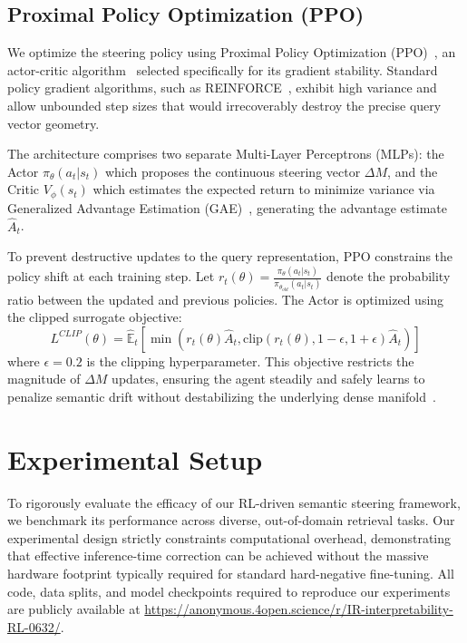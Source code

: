 \subsection{Proximal Policy Optimization (PPO)}
We optimize the steering policy using Proximal Policy Optimization (PPO)~\citep{schulman2017}, an actor-critic algorithm~\citep{konda1999} selected specifically for its gradient stability. Standard policy gradient algorithms, such as REINFORCE~\citep{williams1992}, exhibit high variance and allow unbounded step sizes that would irrecoverably destroy the precise query vector geometry.

The architecture comprises two separate Multi-Layer Perceptrons (MLPs): the Actor $\pi_\theta(a_t|s_t)$ which proposes the continuous steering vector $\Delta M$, and the Critic $V_\phi(s_t)$ which estimates the expected return to minimize variance via Generalized Advantage Estimation (GAE)~\citep{schulman2016}, generating the advantage estimate $\hat{A}_t$.

To prevent destructive updates to the query representation, PPO constrains the policy shift at each training step. Let $r_t(\theta) = \frac{\pi_\theta(a_t|s_t)}{\pi_{\theta_{old}}(a_t|s_t)}$ denote the probability ratio between the updated and previous policies. The Actor is optimized using the clipped surrogate objective:
\begin{equation}
L^{CLIP}(\theta) = \hat{\mathbb{E}}_t \left[ \min(r_t(\theta)\hat{A}_t, \text{clip}(r_t(\theta), 1-\epsilon, 1+\epsilon)\hat{A}_t) \right]
\end{equation}
where $\epsilon = 0.2$ is the clipping hyperparameter. This objective restricts the magnitude of $\Delta M$ updates, ensuring the agent steadily and safely learns to penalize semantic drift without destabilizing the underlying dense manifold~\citep{engstrom2020}.

\section{Experimental Setup}
To rigorously evaluate the efficacy of our RL-driven semantic steering framework, we benchmark its performance across diverse, out-of-domain retrieval tasks. Our experimental design strictly constraints computational overhead, demonstrating that effective inference-time correction can be achieved without the massive hardware footprint typically required for standard hard-negative fine-tuning. All code, data splits, and model checkpoints required to reproduce our experiments are publicly available at \url{https://anonymous.4open.science/r/IR-interpretability-RL-0632/}.

